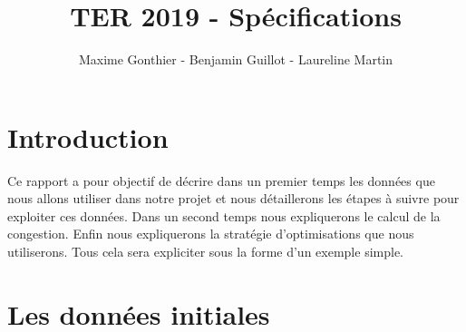\documentclass[a4paper,11pt]{article}
\title{TER 2019 - Spécifications}
\author{Maxime Gonthier - Benjamin Guillot - Laureline Martin}
\begin{document}
\clearpage
\maketitle

\newpage
\tableofcontents

\newpage
\section{Introduction}
	Ce rapport a pour objectif de décrire dans un premier temps les données que nous allons utiliser dans notre projet et nous détaillerons les étapes à suivre pour exploiter ces données. Dans un second temps nous expliquerons le calcul de la congestion. Enfin nous expliquerons la stratégie d'optimisations que nous utiliserons. Tous cela sera expliciter sous la forme d'un exemple simple.

\section{Les données initiales}
\end{document}
